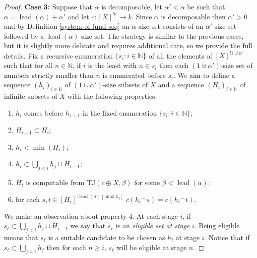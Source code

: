 \documentclass[11pt]{amsart}
\theoremstyle{definition}
\theoremstyle{remark}
\theoremstyle{plain}
\newcommand{\numberset}{\mathbb}
\newcommand{\N}{\numberset{N}}
\def\a{\alpha}
\def\conc{{}^\smallfrown}
\newcommand{\TJ}{\mathsf{TJ}}
\newcommand{\lead}{\operatorname{lead}}
\def\TJ{{\textrm{TJ}}}
\def\N{{\mathbb{N}}}
\begin{document}
\begin{proof}
\textbf{Case 3:} Suppose that $\alpha$ is decomposable, let $\a'<\a$ be such that $\alpha = \lead(\alpha) + \a'$ and let $c \colon [X]^{! \alpha} \to k$.
Since $\alpha$ is decomposable then $\alpha' > 0$ and by Definition \ref{system of fund seq} an $\alpha$-size set consists of an $\alpha'$-size set followed by a $\lead(\alpha)$-size set.
The strategy is similar to the previous cases, but it is slightly more delicate and requires additional care, so we provide the full details.
Fix a recursive enumeration $\{s_i: i \in \N\}$ of all the elements of $[X]^{!1 \uplus \alpha'}$ such that for all $n \in \N$, if $i$ is the least with $n \in s_i$ then each $(1 \uplus \alpha')$-size set of numbers strictly smaller than $n$ is enumerated before $s_i$. 
We aim to define a sequence $(h_i)_{i \in \N}$ of $(1 \uplus \alpha')$-size subsets of $X$ and a sequence $(H_i)_{i \in \N}$ of infinite subsets of $X$ with the following properties:
\begin{enumerate}
    \item $h_i$ comes before $h_{i+1}$ in the fixed enumeration $\{s_i : i \in \N \}$;
    \item $H_{i+1} \subset H_i$;
    \item $h_i < \min(H_i)$;
    \item $h_i \subset \bigcup_{j < i} h_j \cup H_{i-1}$;
    \item $H_i$ is computable from $\TJ(c \oplus X, \beta)$ for some $\beta < \lead(\alpha)$;
    \item for each $s,t \in [H_i]^{! \lead(\alpha)[\max h_i]}$ $c(h_i \conc s) = c(h_i \conc t)$.
\end{enumerate}

We make an observation about property 4.
At each stage $i$, if $s_\ell \subset \bigcup_{j < i} h_j \cup H_{i-1}$ we say that $s_\ell$ is an \textit{eligible set at stage $i$}.
Being eligible means that $s_\ell$ is a suitable candidate to be chosen as $h_i$ at stage $i$.
Notice that if $s_\ell \subset \bigcup_{j < i} h_j$ then for each $n \ge i$, $s_\ell$ will be eligible at stage $n$.


\end{proof}
\end{document}

